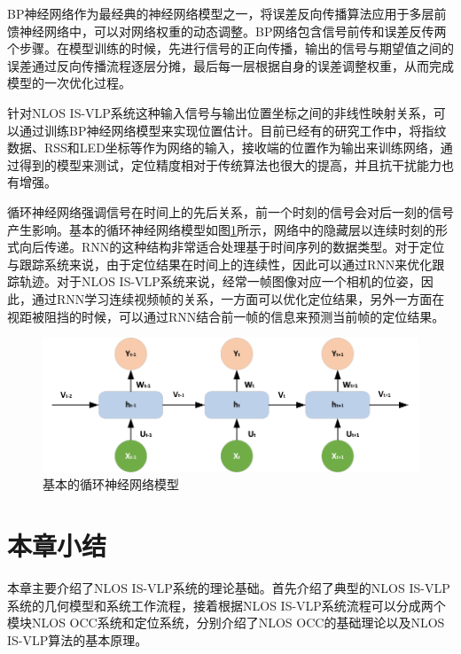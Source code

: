 BP神经网络作为最经典的神经网络模型之一，将误差反向传播算法应用于多层前馈神经网络中，可以对网络权重的动态调整。BP网络包含信号前传和误差反传两个步骤。在模型训练的时候，先进行信号的正向传播，输出的信号与期望值之间的误差通过反向传播流程逐层分摊，最后每一层根据自身的误差调整权重，从而完成模型的一次优化过程。

针对NLOS IS-VLP系统这种输入信号与输出位置坐标之间的非线性映射关系，可以通过训练BP神经网络模型来实现位置估计。目前已经有的研究工作中，将指纹数据、RSS和LED坐标等作为网络的输入，接收端的位置作为输出来训练网络，通过得到的模型来测试，定位精度相对于传统算法也很大的提高，并且抗干扰能力也有增强。

循环神经网络强调信号在时间上的先后关系，前一个时刻的信号会对后一刻的信号产生影响。基本的循环神经网络模型如图\ref{fig:RNN}所示，网络中的隐藏层以连续时刻的形式向后传递。RNN的这种结构非常适合处理基于时间序列的数据类型。对于定位与跟踪系统来说，由于定位结果在时间上的连续性，因此可以通过RNN来优化跟踪轨迹。对于NLOS IS-VLP系统来说，经常一帧图像对应一个相机的位姿，因此，通过RNN学习连续视频帧的关系，一方面可以优化定位结果，另外一方面在视距被阻挡的时候，可以通过RNN结合前一帧的信息来预测当前帧的定位结果。
\begin{figure}[!htbp]
  \centering
  \includegraphics[width=\linewidth]{FIG/RNN.pdf}
  \caption{基本的循环神经网络模型}
  \label{fig:RNN}
\end{figure}

\section{本章小结}
 本章主要介绍了NLOS IS-VLP系统的理论基础。首先介绍了典型的NLOS IS-VLP系统的几何模型和系统工作流程，接着根据NLOS IS-VLP系统流程可以分成两个模块NLOS OCC系统和定位系统，分别介绍了NLOS OCC的基础理论以及NLOS IS-VLP算法的基本原理。


